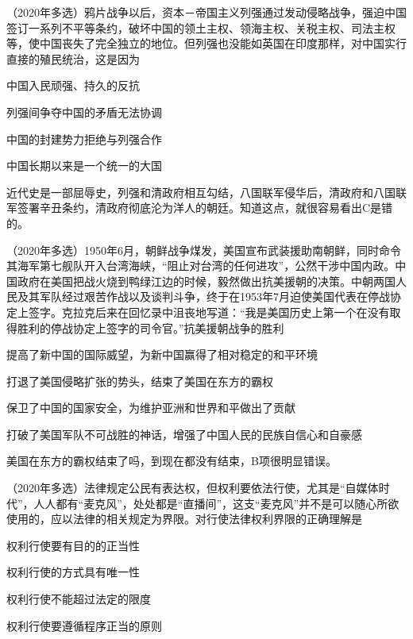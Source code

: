 \documentclass[lang=cn,blue,10pt,scheme=chinese,twocol]{zznote}
\begin{document}
\begin{example} （2020年多选）鸦片战争以后，资本－帝国主义列强通过发动侵略战争，强迫中国签订一系列不平等条约，破坏中国的领土主权、领海主权、关税主权、司法主权等，使中国丧失了完全独立的地位。但列强也没能如英国在印度那样，对中国实行直接的殖民统治，这是因为
	\begin{choice}
		\item 中国入民顽强、持久的反抗
		\item 列强间争夺中国的矛盾无法协调
		\item 中国的封建势力拒绝与列强合作
		\item 中国长期以来是一个统一的大国
	\end{choice}
\end{example}
\begin{solution}
	近代史是一部屈辱史，列强和清政府相互勾结，八国联军侵华后，清政府和八国联军签署辛丑条约，清政府彻底沦为洋人的朝廷。知道这点，就很容易看出C是错的。
\end{solution}
\begin{example} （2020年多选）1950年6月，朝鲜战争煤发，美国宣布武装援助南朝鲜，同时命令其海军第七舰队开入台湾海峡，“阻止对台湾的任何进攻”，公然干涉中国内政。中国政府在美国把战火烧到鸭绿江边的时候，毅然做出抗美援朝的决策。中朝两国人民及其军队经过艰苦作战以及谈判斗争，终于在1953年7月迫使美国代表在停战协定上签字。克拉克后来在回忆录中沮丧地写道：“我是美国历史上第一个在没有取得胜利的停战协定上签字的司令官。”抗美援朝战争的胜利
	\begin{choice}
		\item 提高了新中国的国际威望，为新中国赢得了相对稳定的和平环境
		\item 打退了美国侵略扩张的势头，结束了美国在东方的霸权
		\item 保卫了中国的国家安全，为维护亚洲和世界和平做出了贡献
		\item 打破了美国军队不可战胜的神话，增强了中国人民的民族自信心和自豪感
	\end{choice}
\end{example}
\begin{solution}
	美国在东方的霸权结束了吗，到现在都没有结束，B项很明显错误。
\end{solution}
\begin{example} （2020年多选）法律规定公民有表达权，但权利要依法行使，尤其是“自媒体时代”，人人都有“麦克风”，处处都是“直播间”，这支“麦克风”并不是可以随心所欲使用的，应以法律的相关规定为界限。对行使法律权利界限的正确理解是
	\begin{choice}
		\item 权利行使要有目的的正当性
		\item 权利行使的方式具有唯一性
		\item 权利行使不能超过法定的限度
		\item 权利行使要遵循程序正当的原则
	\end{choice}
\end{example}
\end{document}
